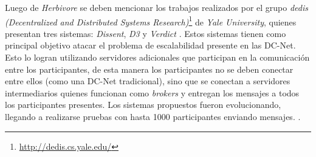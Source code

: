 Luego de \emph{Herbivore} se deben mencionar los trabajos realizados por el grupo \emph{dedis (Decentralized and Distributed Systems Research)}\footnote{\url{http://dedis.cs.yale.edu/}} de \emph{Yale University}, quienes presentan tres sistemas: \emph{Dissent}, \emph{D3} y \emph{Verdict} \cite{corrigan2010dissent, wolinsky2012dissent, wolinsky2012scalable, corrigan2012proactively}. Estos sistemas tienen como principal objetivo atacar el problema de escalabilidad presente en las DC-Net. Esto lo logran utilizando servidores adicionales que participan en la comunicación entre los participantes, de esta manera los participantes no se deben conectar entre ellos (como una DC-Net tradicional), sino que se conectan a servidores intermediarios quienes funcionan como \emph{brokers} y entregan los mensajes a todos los participantes presentes. Los sistemas propuestos fueron evolucionando, llegando a realizarse pruebas con hasta 1000 participantes enviando mensajes. .


